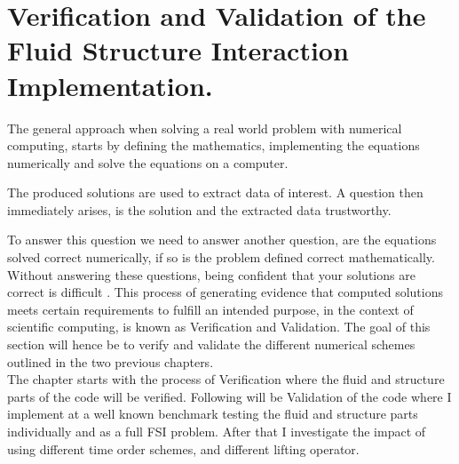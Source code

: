 \chapter{Verification and Validation of the Fluid Structure Interaction Implementation.}\label{chap:VV}
The general approach when solving a real world problem with numerical computing, starts by defining the mathematics, implementing the equations numerically and solve the equations on a computer. 

The produced solutions are used to extract data of interest. A question then immediately arises, is the solution and the extracted data trustworthy.

To answer this question we need to answer another question, are the equations solved correct numerically, if so is the problem defined correct mathematically.
Without answering these questions, being confident that your solutions are correct is difficult \cite{Selin2014}. This process of generating evidence that computed solutions meets certain requirements to fulfill an intended purpose, in the context of scientific computing, is known as Verification and Validation. The goal of this section will hence be to verify and validate the different numerical schemes outlined in the two previous chapters.  \\

The chapter starts with the process of Verification where the fluid and structure parts of the code will be verified. Following will be Validation of the code where I implement at a well known benchmark testing the fluid and structure parts individually and as a full FSI problem. After that I investigate the impact of using different time order schemes, and different lifting operator.\newline

\begin{comment}
We start with Verification, which is the process of assessing numerical correctness and accuracy of a computed solution. Then comes Validation, which is assessing physical accuracy of the numerical model, a process which is done by comparing numerical simulation with experimental data. In simple terms we check that we are solving the equations right and then that we are solving the right equations. The process of Verification has to always come before Validation. Because there is no need in checking if we are using the right equations if the equations are not solved right. 
\end{comment}


